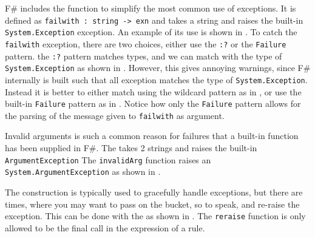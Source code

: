 F\# includes the  function to simplify the most common use of exceptions. It is defined as \lstinline!failwith : string -> exn! and takes a string and raises the built-in \lstinline!System.Exception! exception. An example of its use is shown in .
%
%
To catch the \lstinline!failwith! exception, there are two choices, either use the \lstinline!:?! or the \lstinline!Failure! pattern. the \lstinline!:?! pattern matches types, and we can match with the type of \lstinline!System.Exception! as shown in .
%
%
However, this gives annoying warnings, since F\# internally is built such that all exception matches the type of \lstinline!System.Exception!. Instead it is better to either match using the wildcard pattern as in ,
%
%
or use the built-in \lstinline!Failure! pattern as in .
%
%
Notice how only the \lstinline!Failure! pattern allows for the parsing of the message given to \lstinline!failwith! as argument.

Invalid arguments is such a common reason for failures that a built-in function has been supplied in F\#. The  takes 2 strings and raises the built-in \lstinline!ArgumentException!
%
%
The \lstinline{invalidArg} function raises an \lstinline{System.ArgumentException} as shown in .
%
%

The  construction is typically used to gracefully handle exceptions, but there are times, where you may want to pass on the bucket, so to speak, and re-raise the exception. This can be done with the  as shown in .
%
%
The \lstinline!reraise! function is only allowed to be the final call in the expression of a  rule.

